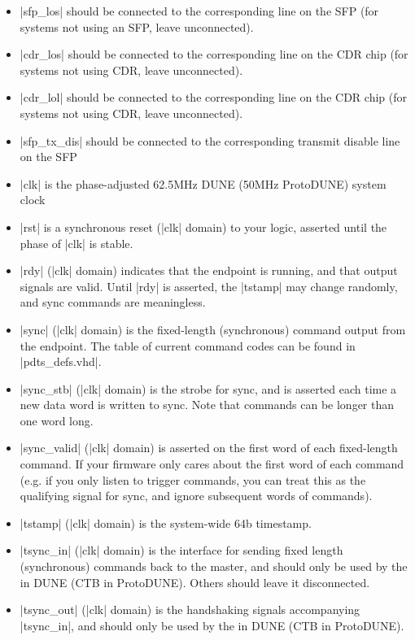 \documentclass{dune}
\begin{document}
\begin{itemize}
\item |sfp_los| should be connected to the corresponding line on the SFP (for systems
not using an SFP, leave unconnected).

\item |cdr_los| should be connected to the corresponding line on the CDR chip (for systems not using
CDR, leave unconnected).

\item |cdr_lol| should be connected to the corresponding line on the CDR chip (for systems not using
CDR, leave unconnected).

\item |sfp_tx_dis| should be connected to the corresponding transmit disable line on the SFP

\item |clk| is the phase-adjusted 62.5MHz DUNE (50MHz ProtoDUNE) system clock

\item |rst| is a synchronous reset (|clk| domain) to your logic, asserted until the phase of |clk|
is stable.

\item |rdy| (|clk| domain) indicates that the endpoint is running, and that output signals are
valid. Until |rdy| is asserted, the |tstamp| may change randomly, and sync commands are
meaningless.

\item |sync| (|clk| domain) is the fixed-length (synchronous) command output from the endpoint. The table of current
command codes can be found in |pdts_defs.vhd|.

\item |sync_stb| (|clk| domain) is the strobe for sync, and is asserted each time a new data word is
written to sync. Note that commands can be longer than one word long.

\item |sync_valid| (|clk| domain) is asserted on the first word of each fixed-length command. If your firmware only
cares about the first word of each command (e.g. if you only listen to trigger
commands, you can treat this as the qualifying signal for sync, and ignore
subsequent words of commands).

\item |tstamp| (|clk| domain) is the system-wide 64b timestamp.

\item |tsync_in| (|clk| domain) is the interface for sending fixed length (synchronous) commands back to the master, and should
only be used by the  in DUNE (CTB in ProtoDUNE). Others should leave it disconnected.

\item |tsync_out| (|clk| domain) is the handshaking signals accompanying |tsync_in|, and should
only be used by the  in DUNE (CTB in ProtoDUNE).

\end{itemize}
\end{document}
